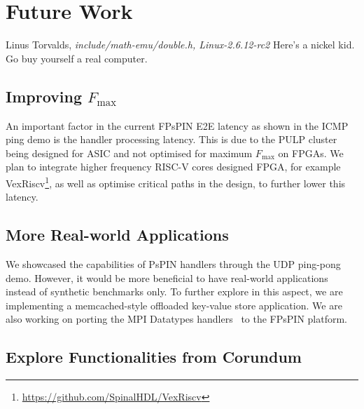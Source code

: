 \chapter{Future Work}
\begin{chapquote}{Linus Torvalds, \textit{include/math-emu/double.h, Linux-2.6.12-rc2}}
Here's a nickel kid.  Go buy yourself a real computer.
\end{chapquote}

\section{Improving $F_{\text{max}}$} \label{sec:improving-fmax}

An important factor in the current FPsPIN E2E latency as shown in the ICMP ping demo is the handler processing latency.  This is due to the PULP cluster being designed for ASIC and not optimised for maximum $F_{\text{max}}$ on FPGAs.  We plan to integrate higher frequency RISC-V cores designed FPGA, for example VexRiscv\footnote{\url{https://github.com/SpinalHDL/VexRiscv}}, as well as optimise critical paths in the design, to further lower this latency.


\section{More Real-world Applications}

We showcased the capabilities of PsPIN handlers through the UDP ping-pong demo.  However, it would be more beneficial to have real-world applications instead of synthetic benchmarks only.  To further explore in this aspect, we are implementing a memcached-style offloaded key-value store application.  We are also working on porting the MPI Datatypes handlers~\cite{Di_Girolamo_2019} to the FPsPIN platform.

\section{Explore Functionalities from Corundum}
